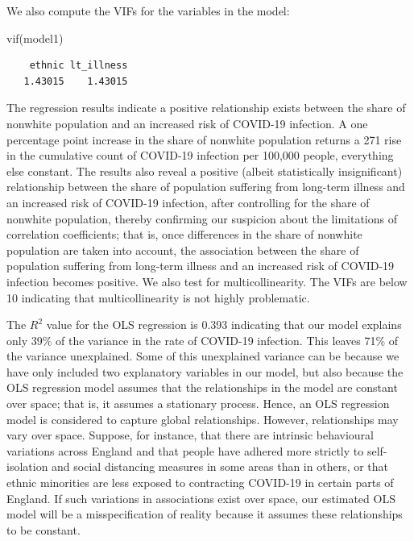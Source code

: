 \documentclass[
  letterpaper,
  DIV=11,
  numbers=noendperiod,
  oneside]{scrreprt}
\newenvironment{Shaded}{\begin{snugshade}}{\end{snugshade}}
\newcommand{\FunctionTok}[1]{\textcolor[rgb]{0.28,0.35,0.67}{#1}}
\newcommand{\NormalTok}[1]{\textcolor[rgb]{0.00,0.23,0.31}{#1}}
\begin{document}
We also compute the VIFs for the variables in the model:

\begin{Shaded}
\begin{Highlighting}[]
\FunctionTok{vif}\NormalTok{(model1)}
\end{Highlighting}
\end{Shaded}

\begin{verbatim}
    ethnic lt_illness 
   1.43015    1.43015 
\end{verbatim}

The regression results indicate a positive relationship exists between
the share of nonwhite population and an increased risk of COVID-19
infection. A one percentage point increase in the share of nonwhite
population returns a 271 rise in the cumulative count of COVID-19
infection per 100,000 people, everything else constant. The results also
reveal a positive (albeit statistically insignificant) relationship
between the share of population suffering from long-term illness and an
increased risk of COVID-19 infection, after controlling for the share of
nonwhite population, thereby confirming our suspicion about the
limitations of correlation coefficients; that is, once differences in
the share of nonwhite population are taken into account, the association
between the share of population suffering from long-term illness and an
increased risk of COVID-19 infection becomes positive. We also test for
multicollinearity. The VIFs are below 10 indicating that
multicollinearity is not highly problematic.

The \(R^{2}\) value for the OLS regression is 0.393 indicating that our
model explains only 39\% of the variance in the rate of COVID-19
infection. This leaves 71\% of the variance unexplained. Some of this
unexplained variance can be because we have only included two
explanatory variables in our model, but also because the OLS regression
model assumes that the relationships in the model are constant over
space; that is, it assumes a stationary process. Hence, an OLS
regression model is considered to capture global relationships. However,
relationships may vary over space. Suppose, for instance, that there are
intrinsic behavioural variations across England and that people have
adhered more strictly to self-isolation and social distancing measures
in some areas than in others, or that ethnic minorities are less exposed
to contracting COVID-19 in certain parts of England. If such variations
in associations exist over space, our estimated OLS model will be a
misspecification of reality because it assumes these relationships to be
constant.
\end{document}
